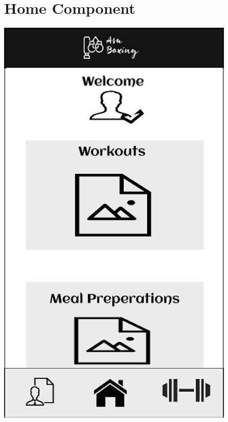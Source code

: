 \documentclass[a4paper,12pt]{report}
\begin{document}
\section{Home Component}

\begin{center}
\includegraphics[scale=.5]{images/homePageBorder.png}
\end{center}
\end{document}

